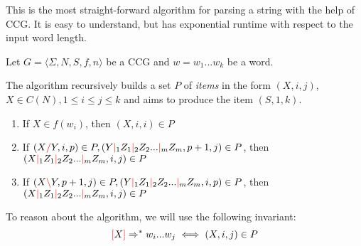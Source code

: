 \documentclass[12pt]{extarticle}
\theoremstyle{definition} \newtheorem{defn}{Definition}
\theoremstyle{definition} \newtheorem{prop}{Proposition}
\theoremstyle{definition} \newtheorem{property}{Property}
\newcommand{\lc}{\textcolor{red}{\backslash}}
\newcommand{\rc}{\textcolor{red}{/}}
\newcommand{\mc}{\textcolor{red}{|}}
\newcommand{\lb}{\textcolor{red}{[}}
\newcommand{\rb}{\textcolor{red}{]}}
\begin{document}
This is the most straight-forward algorithm for parsing a string with the help
of CCG. It is easy to understand, but has exponential runtime with respect to
the input word length.

Let $ G = \langle \Sigma, N, S, f, n \rangle $ be a CCG and $w = w_1 ... w_k$
be a word.

The algorithm recursively builds a set $P$ of \emph{items} in the form
$(X, i, j)$, $X \in C(N), 1 \leq i \leq j \leq k$ and aims to produce the item
$(S, 1, k)$.

\begin{enumerate}
    \item If $X \in f(w_i)$, then $(X, i, i) \in P$
    \item If $(X \rc Y, i, p) \in P, (Y \mc_1 Z_1 \mc_2 Z_2 ... \mc_m Z_m, p + 1, j) \in P$,
        then $(X \mc_1 Z_1 \mc_2 Z_2 ... \mc_m Z_m, i, j) \in P$
    \item If $(X \lc Y, p + 1, j) \in P, (Y \mc_1 Z_1 \mc_2 Z_2 ... \mc_m Z_m, i, p) \in P$,
        then $(X \mc_1 Z_1 \mc_2 Z_2 ... \mc_m Z_m, i, j) \in P$
\end{enumerate}

To reason about the algorithm, we will use the following invariant:
\begin{equation}
    \lb X \rb \Rightarrow^* w_i ... w_j \iff (X, i, j) \in P
\end{equation}
\end{document}
